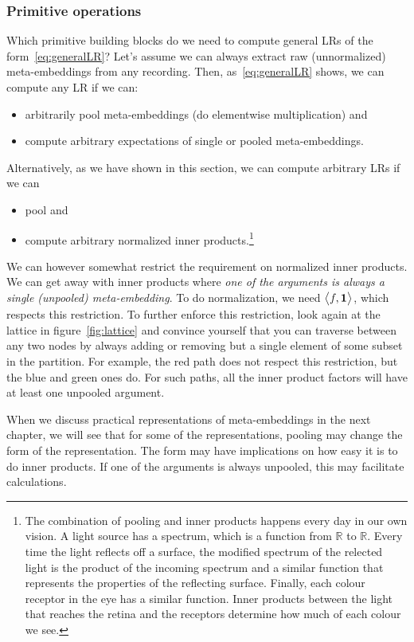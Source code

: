 \documentclass[a4paper,oneside,12pt,english]{report}
\def\expv#1#2{\bigl\langle#1\bigr\rangle_{#2}}
\def\R{\mathbb{R}}
\def\dot#1#2{\expv{#1,#2}{}}
\begin{document}
\subsubsection{Primitive operations}
Which primitive building blocks do we need to compute general LRs of the form~\eqref{eq:generalLR}? Let's assume we can always extract raw (unnormalized) meta-embeddings from any recording. Then, as~\eqref{eq:generalLR} shows, we can compute any LR if we can:
\begin{itemize}
	\item arbitrarily pool meta-embeddings (do elementwise multiplication) and
	\item compute arbitrary expectations of single or pooled meta-embeddings.
\end{itemize}
Alternatively, as we have shown in this section, we can compute arbitrary LRs if we can
\begin{itemize}
	\item pool and
	\item compute arbitrary normalized inner products.\footnote{The combination of pooling and inner products happens every day in our own vision. A light source has a spectrum, which is a function from $\R$ to $\R$. Every time the light reflects off a surface, the modified spectrum of the relected light is the product of the incoming spectrum and a similar function that represents the properties of the reflecting surface. Finally, each colour receptor in the eye has a similar function. Inner products between the light that reaches the retina and the receptors determine how much of each colour we see.}
\end{itemize}
We can however somewhat restrict the requirement on normalized inner products. We can get away with inner products where \emph{one of the arguments is always a single (unpooled) meta-embedding}. To do normalization, we need $\dot{f}{\onevec}$, which respects this restriction. To further enforce this restriction, look again at the lattice in figure~\ref{fig:lattice} and convince yourself that you can traverse between any two nodes by always adding or removing but a single element of some subset in the partition. For example, the red path does not respect this restriction, but the blue and green ones do. For such paths, all the inner product factors will have at least one unpooled argument.

When we discuss practical representations of meta-embeddings in the next chapter, we will see that for some of the representations, pooling may change the form of the representation. The form may have implications on how easy it is to do inner products. If one of the arguments is always unpooled, this may facilitate calculations.
\end{document}
